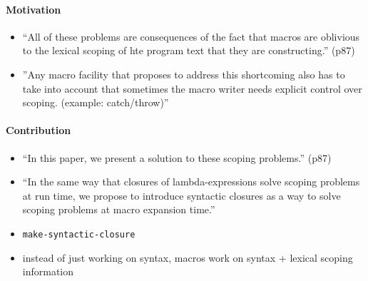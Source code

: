 \documentclass[12pt]{article}	%
\begin{document}
\paragraph{Motivation}
\begin{itemize}
	\item ``All of these problems are consequences of the fact that macros are oblivious to the lexical scoping of hte program text that they are constructing.'' (p87)
	\item ''Any macro facility that proposes to address this shortcoming also has to take into account that sometimes the macro writer needs explicit control over scoping. (example: catch/throw)''
\end{itemize}
\paragraph{Contribution}
\begin{itemize}
	\item ``In this paper, we present a solution to these scoping problems.'' (p87)
	\item ``In the same way that closures of lambda-expressions solve scoping problems at run time, we propose to introduce syntactic closures as a way to solve scoping problems at macro expansion time.''
	\item \verb!make-syntactic-closure!
	\item instead of just working on syntax, macros work on syntax + lexical scoping information
\end{itemize}
\end{document}
